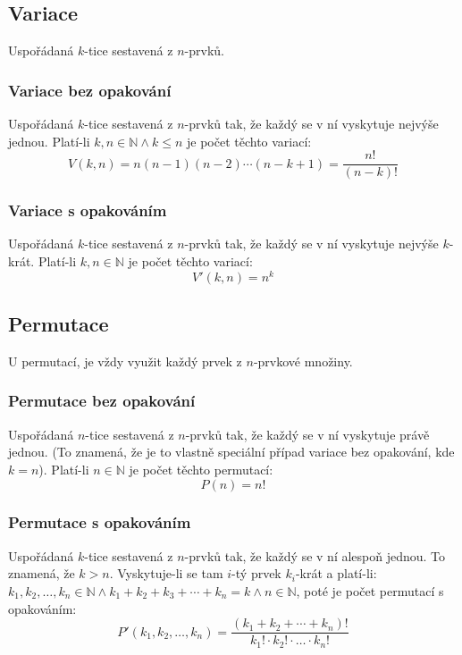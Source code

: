 \documentclass[12pt]{article}
\begin{document}
\subsection{Variace}
Uspořádaná $k$-tice sestavená z $n$-prvků.
\subsubsection{Variace bez opakování}
Uspořádaná $k$-tice sestavená z $n$-prvků tak, že každý se v ní vyskytuje nejvýše jednou. Platí-li $k,n \in \mathbb{N} \land k \leq n$ je počet těchto variací:
\begin{equation}
V(k,n) = n (n-1)(n-2) \dotsm (n-k+1) = \frac{n!}{\left( n-k \right)!}
\end{equation}
\subsubsection{Variace s opakováním}
Uspořádaná $k$-tice sestavená z $n$-prvků tak, že každý se v ní vyskytuje nejvýše $k$-krát. Platí-li $k,n \in \mathbb{N}$ je počet těchto variací:
\begin{equation}
V'(k,n) = n^k
\end{equation}

\subsection{Permutace}
U permutací, je vždy využit každý prvek z $n$-prvkové množiny.
\subsubsection{Permutace bez opakování}
Uspořádaná $n$-tice sestavená z $n$-prvků tak, že každý se v ní vyskytuje právě jednou. (To znamená, že je to vlastně speciální případ variace bez opakování, kde $k=n$). Platí-li $n \in \mathbb{N}$ je počet těchto permutací:
\begin{equation}
P(n) = n!
\end{equation}
\subsubsection{Permutace s opakováním}
Uspořádaná $k$-tice sestavená z $n$-prvků tak, že každý se v ní alespoň jednou. To znamená, že $k >n$.
Vyskytuje-li se tam $i$-tý prvek $k_i$-krát a platí-li: $k_1, k_2, \dotsc, k_n \in \mathbb{N} \land k_1 + k_2 + k_3 + \dotsb + k_n = k \land n \in \mathbb{N}$, poté je počet permutací s opakováním:
\begin{equation}
P'\left(k_1,k_2, \dotsc, k_n \right) = \frac{\left( k_1 + k_2 + \dotsb + k_n \right)!}{k_1! \cdot k_2 ! \cdot \dotso \cdot k_n!}
\end{equation}
\end{document}
